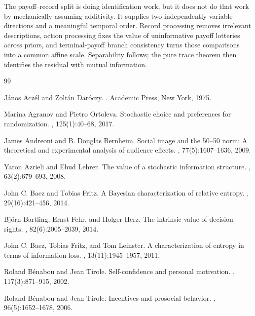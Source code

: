 \documentclass[11pt,a4paper]{article}
\theoremstyle{definition}
\newcommand{\1}{\mathbf 1}
\begin{document}
The payoff--record split is doing identification work, but it does not do that work by mechanically assuming
additivity.  It supplies two independently variable directions and a meaningful temporal order.  Record processing
removes irrelevant descriptions, action processing fixes the value of uninformative payoff lotteries across priors,
and terminal-payoff branch consistency turns those comparisons into a common affine scale.  Separability follows;
the pure trace theorem then identifies the residual with mutual information.

\begin{thebibliography}{99}
\raggedright

J\'anos Acz\'el and Zolt\'an Dar\'oczy.
.
\newblock Academic Press, New York, 1975.

Marina Agranov and Pietro Ortoleva.
\newblock Stochastic choice and preferences for randomization.
, 125(1):40--68, 2017.

James Andreoni and B. Douglas Bernheim.
\newblock Social image and the 50--50 norm: A theoretical and experimental analysis of audience effects.
, 77(5):1607--1636, 2009.

Yaron Azrieli and Ehud Lehrer.
\newblock The value of a stochastic information structure.
, 63(2):679--693, 2008.

John C. Baez and Tobias Fritz.
\newblock A {B}ayesian characterization of relative entropy.
, 29(16):421--456, 2014.

Bj\"orn Bartling, Ernst Fehr, and Holger Herz.
\newblock The intrinsic value of decision rights.
, 82(6):2005--2039, 2014.

John C. Baez, Tobias Fritz, and Tom Leinster.
\newblock A characterization of entropy in terms of information loss.
, 13(11):1945--1957, 2011.

Roland B\'enabou and Jean Tirole.
\newblock Self-confidence and personal motivation.
, 117(3):871--915, 2002.

Roland B\'enabou and Jean Tirole.
\newblock Incentives and prosocial behavior.
, 96(5):1652--1678, 2006.


\end{thebibliography}
\end{document}
